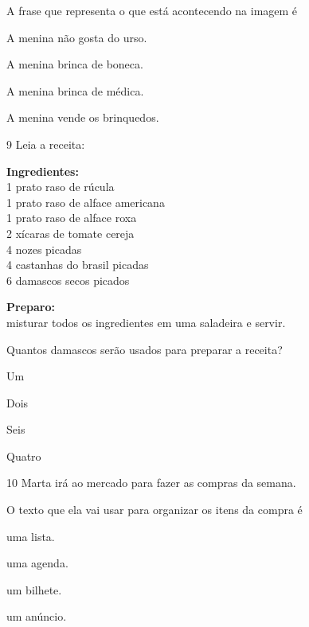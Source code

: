 
A frase que representa o que está acontecendo na imagem é

\begin{escolha}
\item A menina não gosta do urso.

\item A menina brinca de boneca.

\item A menina brinca de médica.

\item A menina vende os brinquedos.
\end{escolha}

\num{9} Leia a receita:

\textbf{Ingredientes:}\\
1 prato raso de rúcula\\
1 prato raso de alface americana\\
1 prato raso de alface roxa\\
2 xícaras de tomate cereja\\
4 nozes picadas\\
4 castanhas do brasil picadas\\
6 damascos secos picados

\textbf{Preparo:}\\
misturar todos os ingredientes em uma saladeira e servir.


Quantos damascos serão usados para preparar a receita?

\begin{escolha}
\item Um

\item Dois

\item Seis

\item Quatro
\end{escolha}


\num{10} Marta irá ao mercado para fazer as compras da semana.

O texto que ela vai usar para organizar os itens da compra é

\begin{escolha}
\item uma lista.

\item uma agenda.

\item um bilhete.

\item um anúncio.
\end{escolha}

